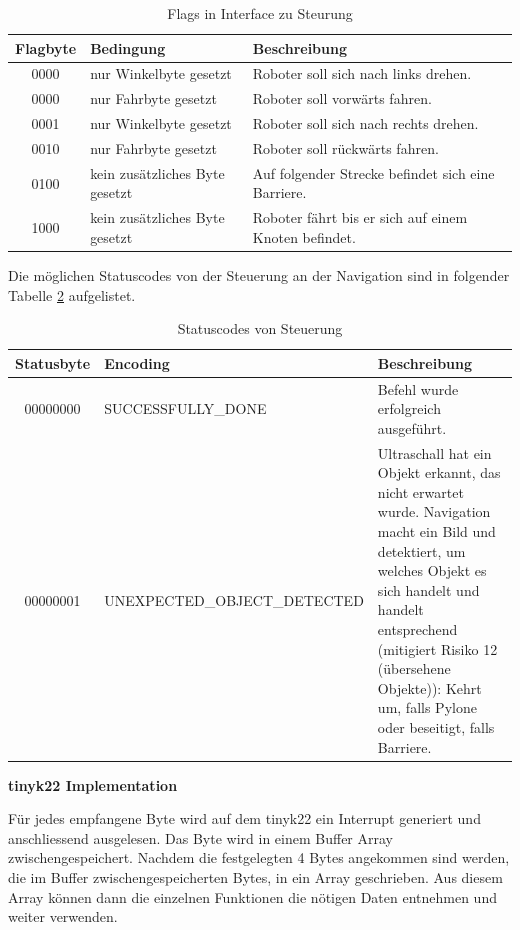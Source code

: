 \begin{table}[H]
\centering
\small
\begin{tabularx}{\textwidth}{|c|X|X|}
\hline
  \textbf{Flagbyte} & \textbf{Bedingung} & \textbf{Beschreibung}\\
  \hline
      0000&nur Winkelbyte gesetzt&Roboter soll sich nach links drehen.\\
  \hline
        0000&nur Fahrbyte gesetzt&Roboter soll vorwärts fahren.\\
  \hline
0001&nur Winkelbyte gesetzt&Roboter soll sich nach rechts drehen.\\
  \hline

0010&nur Fahrbyte gesetzt&Roboter soll rückwärts fahren.\\
  \hline

0100&kein zusätzliches Byte gesetzt&Auf folgender Strecke befindet sich eine Barriere.\\
  \hline
1000&kein zusätzliches Byte gesetzt&Roboter fährt bis er sich auf einem Knoten befindet.\\
  \hline
  \end{tabularx}
\caption{Flags in Interface zu Steurung}
\label{table:flag-to-tiny}
\end{table}



Die möglichen Statuscodes von der Steuerung an der Navigation sind in folgender Tabelle \ref{table:statuscodes} aufgelistet.

\begin{table}[H]
\centering
\small
\begin{tabularx}{\textwidth}{|c|l|X|}
\hline
  \textbf{Statusbyte} & \textbf{Encoding} & \textbf{Beschreibung} \\
  \hline
      00000000&SUCCESSFULLY\_DONE&Befehl wurde erfolgreich ausgeführt. \\
  \hline
00000001&UNEXPECTED\_OBJECT\_DETECTED &Ultraschall hat ein Objekt erkannt, das nicht erwartet wurde. Navigation macht ein Bild und detektiert, um welches Objekt es sich handelt und handelt entsprechend (mitigiert Risiko 12 (übersehene Objekte)): Kehrt um, falls Pylone oder beseitigt, falls Barriere.\\
  \hline
\end{tabularx}
\caption{Statuscodes von Steuerung}
\label{table:statuscodes}
\end{table}

\textbf{\gls{tinyk22} Implementation}

Für jedes empfangene Byte wird auf dem \gls{tinyk22} ein Interrupt generiert und anschliessend ausgelesen. Das Byte wird in einem Buffer Array zwischengespeichert. Nachdem die festgelegten 4 Bytes angekommen sind werden, die im Buffer zwischengespeicherten Bytes, in ein Array geschrieben. Aus diesem Array können dann die einzelnen Funktionen die nötigen Daten entnehmen und weiter verwenden.

